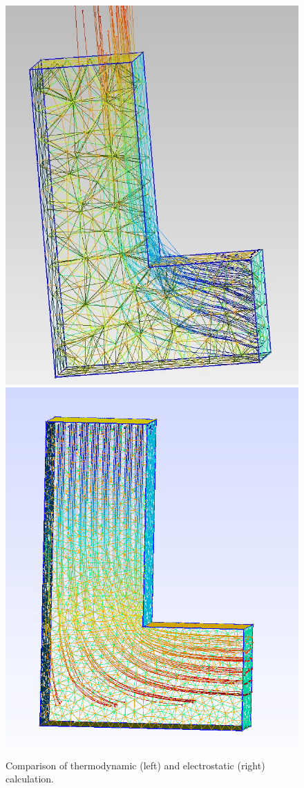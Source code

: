 \documentclass[preprint,journal]{vgtc}       %
\begin{document}
\begin{figure}
	
	\begin{minipage}{\linewidth}
		\includegraphics[width=.5\linewidth]{L.jpg} %
		\includegraphics[width=.53\linewidth]{L-ele.png}
		\caption{Comparison of thermodynamic (left) and electrostatic (right) calculation.}
		\label{fig:L}
	\end{minipage}
\end{figure}
\end{document}
